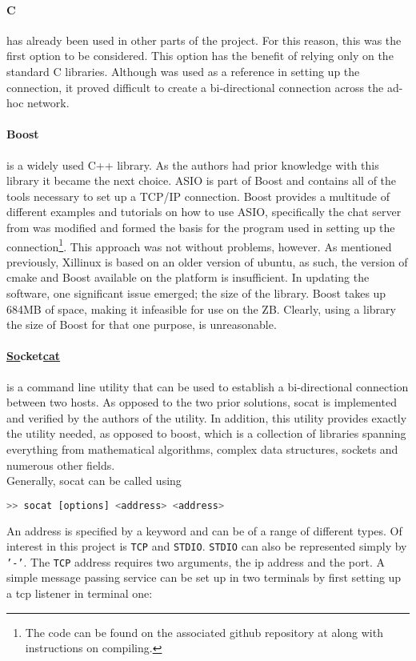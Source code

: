 
\paragraph*{C}has already been used in other parts of the project.
For this reason, this was the first option to be considered.
This option has the benefit of relying only on the standard C libraries.
Although \cite{beej} was used as a reference in setting up the connection, it proved difficult to create a bi-directional connection across the ad-hoc network.

\paragraph*{Boost}is a widely used C++ library.
As the authors had prior knowledge with this library it became the next choice.
ASIO is part of Boost and contains all of the tools necessary to set up a TCP/IP connection.
Boost provides a multitude of different examples and tutorials on how to use ASIO, specifically the chat server from \cite{boostchat} was modified and formed the basis for the program used in setting up the connection\footnote{The code can be found on the associated github repository at  along with instructions on compiling.}.
This approach was not without problems, however.
As mentioned previously, Xillinux is based on an older version of ubuntu, as such, the version of cmake and Boost available on the platform is insufficient.
In updating the software, one significant issue emerged; the size of the library.
Boost takes up 684MB of space, making it infeasible for use on the ZB.
Clearly, using a library the size of Boost for that one purpose, is unreasonable.

\paragraph*{\underline{So}cket\underline{cat}} is a command line utility that can be used to establish a bi-directional connection between two hosts.
As opposed to the two prior solutions, socat is implemented and verified by the authors of the utility.
In addition, this utility provides exactly the utility needed, as opposed to boost, which is a collection of libraries spanning everything from mathematical algorithms, complex data structures, sockets and numerous other fields.\\
Generally, socat can be called using
\begin{lstlisting}[language=bash]
>> socat [options] <address> <address>
\end{lstlisting}
An address is specified by a keyword and can be of a range of different types.
Of interest in this project is \texttt{TCP} and \texttt{STDIO}.
\texttt{STDIO} can also be represented simply by \texttt{'-'}.
The \texttt{TCP} address requires two arguments, the ip address and the port.
A simple message passing service can be set up in two terminals by first setting up a tcp listener in terminal one:

